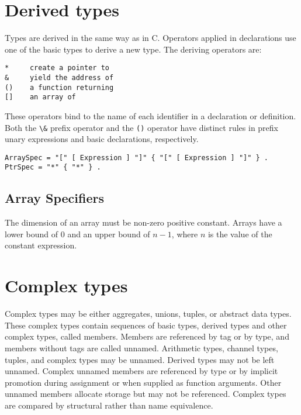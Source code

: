 \hypertarget{derived-types}{%
\section{Derived types}\label{derived-types}}

Types are derived in the same way as in C. Operators applied in
declarations use one of the basic types to derive a new type. The
deriving operators are:

\begin{lstlisting}
*     create a pointer to 
&     yield the address of
()    a function returning 
[]    an array of
\end{lstlisting}

These operators bind to the name of each identifier in a declaration or
definition. Both the \passthrough{\lstinline!\&!} prefix operator and
the \passthrough{\lstinline!()!} operator have distinct rules in prefix
unary expressions and basic declarations, respectively.

\begin{lstlisting}
ArraySpec = "[" [ Expression ] "]" { "[" [ Expression ] "]" } .
PtrSpec = "*" { "*" } . 
\end{lstlisting}

\hypertarget{array-specifiers}{%
\subsection{Array Specifiers}\label{array-specifiers}}

The dimension of an array must be non-zero positive constant. Arrays
have a lower bound of $0$ and an upper bound of $n-1$, where $n$ is the value
of the constant expression.

\hypertarget{complex-types}{%
\section{Complex types}\label{complex-types}}

Complex types may be either aggregates, unions, tuples, or abstract data
types. These complex types contain sequences of basic types, derived
types and other complex types, called members. Members are referenced by
tag or by type, and members without tags are called unnamed. Arithmetic
types, channel types, tuples, and complex types may be unnamed. Derived
types may not be left unnamed. Complex unnamed members are referenced by
type or by implicit promotion during assignment or when supplied as
function arguments. Other unnamed members allocate storage but may not
be referenced. Complex types are compared by structural rather than name
equivalence.

